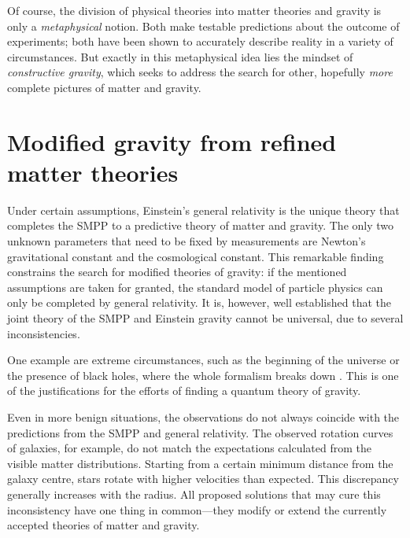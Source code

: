 Of course, the division of physical theories into matter theories and gravity is only a \emph{metaphysical} notion. Both make testable predictions about the outcome of experiments; both have been shown to accurately describe reality in a variety of circumstances. But exactly in this metaphysical idea lies the mindset of \emph{constructive gravity}, which seeks to address the search for other, hopefully \emph{more} complete pictures of matter and gravity.

\section{Modified gravity from refined matter theories}
Under certain assumptions, Einstein's general relativity is the unique theory that completes the SMPP to a predictive theory of matter and gravity. \cite{Lovelock_1969,Hojman_1976,Deser_1970} The only two unknown parameters that need to be fixed by measurements are Newton's gravitational constant and the cosmological constant. This remarkable finding constrains the search for modified theories of gravity: if the mentioned assumptions are taken for granted, the standard model of particle physics can only be completed by general relativity. It is, however, well established that the joint theory of the SMPP and Einstein gravity cannot be universal, due to several inconsistencies.

One example are extreme circumstances, such as the beginning of the universe or the presence of black holes, where the whole formalism breaks down \cite{}. This is one of the justifications for the efforts of finding a quantum theory of gravity.

Even in more benign situations, the observations do not always coincide with the predictions from the SMPP and general relativity. The observed rotation curves of galaxies, for example, do not match the expectations calculated from the visible matter distributions. Starting from a certain minimum distance from the galaxy centre, stars rotate with higher velocities than expected. \cite{Freeman_1970,Rubin_1970,Rubin_1980} This discrepancy generally increases with the radius. All proposed solutions \cite{} that may cure this inconsistency have one thing in common---they modify or extend the currently accepted theories of matter and gravity.

